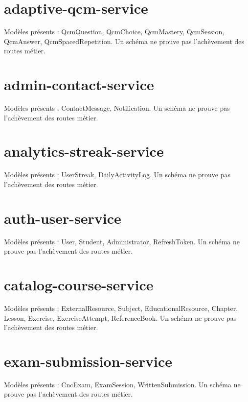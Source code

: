 \section{adaptive-qcm-service}
Modèles présents : QcmQuestion, QcmChoice, QcmMastery, QcmSession, QcmAnswer, QcmSpacedRepetition. Un schéma ne prouve pas l’achèvement des routes métier.


\section{admin-contact-service}
Modèles présents : ContactMessage, Notification. Un schéma ne prouve pas l’achèvement des routes métier.


\section{analytics-streak-service}
Modèles présents : UserStreak, DailyActivityLog. Un schéma ne prouve pas l’achèvement des routes métier.


\section{auth-user-service}
Modèles présents : User, Student, Administrator, RefreshToken. Un schéma ne prouve pas l’achèvement des routes métier.


\section{catalog-course-service}
Modèles présents : ExternalResource, Subject, EducationalResource, Chapter, Lesson, Exercise, ExerciseAttempt, ReferenceBook. Un schéma ne prouve pas l’achèvement des routes métier.


\section{exam-submission-service}
Modèles présents : CncExam, ExamSession, WrittenSubmission. Un schéma ne prouve pas l’achèvement des routes métier.


